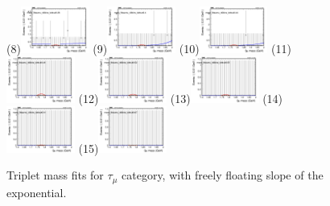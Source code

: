 \begin{figure}[h!]
        \subfigure(8){\includegraphics[width=0.2\textwidth]{power_law/plots/taumu/massfit_taumu_40bins_bdtcut0.36.png}}
        \subfigure(9){\includegraphics[width=0.2\textwidth]{power_law/plots/taumu/massfit_taumu_40bins_bdtcut0.4.png}}
        \subfigure(10){\includegraphics[width=0.2\textwidth]{power_law/plots/taumu/massfit_taumu_40bins_bdtcut0.44.png}}
        \subfigure(11){\includegraphics[width=0.2\textwidth]{power_law/plots/taumu/massfit_taumu_40bins_bdtcut0.48.png}}
        \subfigure(12){\includegraphics[width=0.2\textwidth]{power_law/plots/taumu/massfit_taumu_40bins_bdtcut0.52.png}}
        \subfigure(13){\includegraphics[width=0.2\textwidth]{power_law/plots/taumu/massfit_taumu_40bins_bdtcut0.55.png}}
        \subfigure(14){\includegraphics[width=0.2\textwidth]{power_law/plots/taumu/massfit_taumu_40bins_bdtcut0.61.png}}
        \subfigure(15){\includegraphics[width=0.2\textwidth]{power_law/plots/taumu/massfit_taumu_40bins_bdtcut0.67.png}}
        \caption{Triplet mass fits for $\tau_{\mu}$ category, with freely floating slope of the exponential.}
        \label{fig:unfixed_taumu}
\end{figure}

